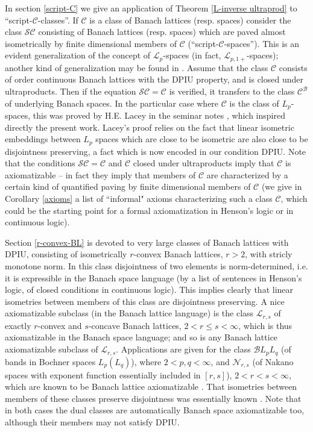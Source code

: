 \documentclass[11pt]{amsart}
\theoremstyle{plain}
\theoremstyle{remark}
\newcommand{\C}{\mathcal C}
\begin{document}
In section \ref{script-C}  we give an application of Theorem \ref{L-inverse ultraprod} to ``script-$\mathcal C$-classes''. If $\mathcal C$ is a class of Banach lattices (resp. spaces) consider the class $\mathcal{SC}$ consisting of Banach lattices (resp. spaces) which are paved almost isometrically by finite dimensional members of   $\mathcal C$ (``script-$\mathcal C$-spaces''). This is an evident generalization of the concept of  $\mathcal L_p$-spaces (in fact, $\mathcal L_{p,1+}$-spaces); another kind of generalization may be found in \cite{Ri}. Assume that the class $\mathcal{C}$ consists of order continuous Banach lattices with the DPIU property, and is closed under ultraproducts. Then if the equation $\mathcal{SC}=\mathcal C$ is verified, it transfers  to the class $\mathcal C^\mathcal B$ of underlying Banach spaces. In the particular case where $\C$ is the class  of $L_p$-spaces, this was proved by H.E. Lacey in the seminar notes \cite{L}, which inspired directly the present work. Lacey's proof relies on the fact that linear isometric embeddings between $L_p$ spaces which are close to be isometric are also close to be disjointness preserving, a fact which is now encoded in our condition DPIU. Note that the conditions  $\mathcal{SC}=\mathcal C$ and $\C$ closed under ultraproducts imply that $\C$ is axiomatizable -- in fact they imply that members of $\C$ are characterized by a certain kind of quantified paving by finite dimensional members of $\C$ (we give in Corollary \ref{axioms} a list of ``informal" axioms characterizing such a class $\C$, which could be the starting point for a formal axiomatization in Henson's logic or in continuous logic).

Section \ref{r-convex-BL} is devoted to very large classes of Banach lattices with DPIU, consisting of isometrically $r$-convex Banach lattices, $r>2$, with stricly monotone norm. In this class disjointness of two elements is norm-determined, i.e. it is expressible in the Banach space language (by a list of sentences in Henson's logic, of closed conditions in continuous logic). This implies clearly that linear isometries between members of this class are disjointness preserving. A nice axiomatizable subclass  (in the Banach lattice language) is the class $\mathcal L_{r,s}$ of exactly $r$-convex and $s$-concave Banach lattices, $2<r\leq s<\infty$, which is thus axiomatizable in the Banach space language; and so is any Banach lattice axiomatizable subclass of $\mathcal L_{r,s}$. Applications are given for the class $\mathcal{B}L_pL_q$ (of bands in Bochner spaces $L_p(L_q)$), where $2<p,q<\infty$, and $\mathcal N_{r,s}$ (of Nakano spaces with exponent function essentially included in $[r,s]$), $2<r<s<\infty$, which are known to be  Banach lattice axiomatizable \cite{HR,P,PR}. That isometries between members of these classes preserve disjointness was essentially known \cite{GR,JKP}. Note that in both cases the dual classes are automatically Banach space axiomatizable too, although their members may not satisfy DPIU.
\end{document}
